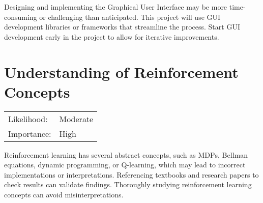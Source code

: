 \documentclass[]{final_report}
\begin{document}
Designing and implementing the Graphical User Interface may be more time-consuming or challenging than anticipated. This project will use GUI development libraries or frameworks that streamline the process. Start GUI development early in the project to allow for iterative improvements.

\section{Understanding of Reinforcement Concepts}

\begin{center}
    \begin{tabular}{l l  }
    Likelihood: & Moderate \\
    Importance: & High \\
    \end{tabular}
  \end{center}

Reinforcement learning has several abstract concepts, such as MDPs, Bellman equations, dynamic programming, or Q-learning, which may lead to incorrect implementations or interpretations. Referencing textbooks and research papers to check results can validate findings. Thoroughly studying reinforcement learning concepts can avoid misinterpretations.


\newpage



\label{endpage}
\end{document}
